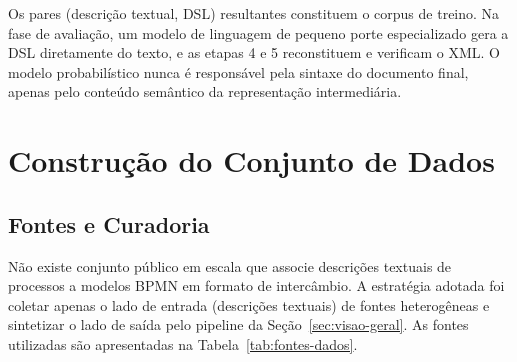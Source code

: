 

Os pares (descrição textual, DSL) resultantes constituem o corpus de treino. Na fase de avaliação, um modelo de linguagem de pequeno porte especializado gera a DSL diretamente do texto, e as etapas 4 e 5 reconstituem e verificam o XML. O modelo probabilístico nunca é responsável pela sintaxe do documento final, apenas pelo conteúdo semântico da representação intermediária.

\section{Construção do Conjunto de Dados}
\label{sec:dados}

\subsection{Fontes e Curadoria}
\label{subsec:fontes}

Não existe conjunto público em escala que associe descrições textuais de processos a modelos BPMN em formato de intercâmbio. A estratégia adotada foi coletar apenas o lado de entrada (descrições textuais) de fontes heterogêneas e sintetizar o lado de saída pelo pipeline da Seção~\ref{sec:visao-geral}. As fontes utilizadas são apresentadas na Tabela~\ref{tab:fontes-dados}.

\begin{table}[h!]
\end{table}

